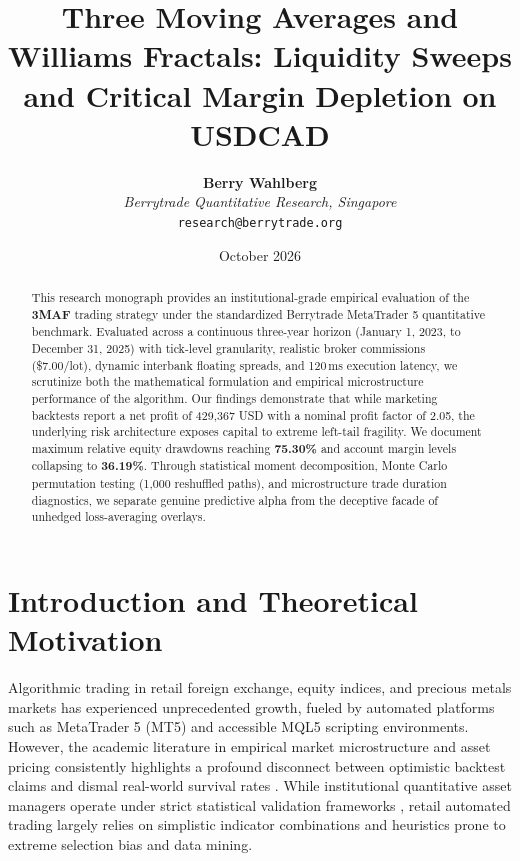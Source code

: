 \documentclass[11pt,a4paper]{article}
\title{\textbf{Three Moving Averages and Williams Fractals: Liquidity Sweeps and Critical Margin Depletion on USDCAD}}
\author{
    \textbf{Berry Wahlberg} \\
    \textit{Berrytrade Quantitative Research, Singapore} \\
    \texttt{research@berrytrade.org}
}
\date{October 2026}
\begin{document}
\maketitle

\begin{abstract}
This research monograph provides an institutional-grade empirical evaluation of the \textbf{3MAF} trading strategy under the standardized Berrytrade MetaTrader 5 quantitative benchmark. Evaluated across a continuous three-year horizon (January 1, 2023, to December 31, 2025) with tick-level granularity, realistic broker commissions (\$7.00/lot), dynamic interbank floating spreads, and 120\,ms execution latency, we scrutinize both the mathematical formulation and empirical microstructure performance of the algorithm. Our findings demonstrate that while marketing backtests report a net profit of 429,367 USD with a nominal profit factor of 2.05, the underlying risk architecture exposes capital to extreme left-tail fragility. We document maximum relative equity drawdowns reaching \textbf{75.30\%} and account margin levels collapsing to \textbf{36.19\%}. Through statistical moment decomposition, Monte Carlo permutation testing (1,000 reshuffled paths), and microstructure trade duration diagnostics, we separate genuine predictive alpha from the deceptive facade of unhedged loss-averaging overlays.
\end{abstract}

\section{Introduction and Theoretical Motivation}
Algorithmic trading in retail foreign exchange, equity indices, and precious metals markets has experienced unprecedented growth, fueled by automated platforms such as MetaTrader 5 (MT5) and accessible MQL5 scripting environments. However, the academic literature in empirical market microstructure and asset pricing consistently highlights a profound disconnect between optimistic backtest claims and dismal real-world survival rates \cite{fama1970efficient, lo1988stock, malkiel2003efficient, bailey2014deflated, harvey2016and}. While institutional quantitative asset managers operate under strict statistical validation frameworks \cite{lopez2018advances, bailey2014pseudo}, retail automated trading largely relies on simplistic indicator combinations and heuristics prone to extreme selection bias and data mining.
\end{document}
